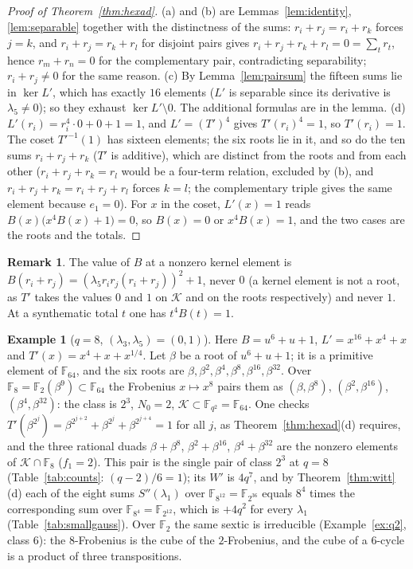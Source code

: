 ﻿\documentclass[12pt,a4paper]{amsart}
\theoremstyle{definition}
\newtheorem{remark}[theorem]{Remark}
\newtheorem{example}[theorem]{Example}
\newcommand{\F}{\mathbb{F}}
\newcommand{\Kk}{\mathcal{K}}
\newcommand{\Spp}{S''}
\begin{document}
\begin{proof}[Proof of Theorem~\ref{thm:hexad}]
(a) and (b) are Lemmas~\ref{lem:identity}, \ref{lem:separable} together with the distinctness of the sums: $r_i+r_j=r_i+r_k$ forces $j=k$, and $r_i+r_j=r_k+r_l$ for disjoint pairs gives $r_i+r_j+r_k+r_l=0=\sum_tr_t$, hence $r_m+r_n=0$ for the complementary pair, contradicting separability; $r_i+r_j\ne0$ for the same reason. (c) By Lemma~\ref{lem:pairsum} the fifteen sums lie in $\ker L'$, which has exactly $16$ elements ($L'$ is separable since its derivative is $\lambda_5\ne0$); so they exhaust $\ker L'\setminus0$. The additional formulas are in the lemma. (d) $L'(r_i)=r_i^4\cdot0+0+1=1$, and $L'=(T')^4$ gives $T'(r_i)^4=1$, so $T'(r_i)=1$. The coset $T'^{-1}(1)$ has sixteen elements; the six roots lie in it, and so do the ten sums $r_i+r_j+r_k$ ($T'$ is additive), which are distinct from the roots and from each other ($r_i+r_j+r_k=r_l$ would be a four-term relation, excluded by (b), and $r_i+r_j+r_k=r_i+r_j+r_l$ forces $k=l$; the complementary triple gives the same element because $e_1=0$). For $x$ in the coset, $L'(x)=1$ reads $B(x)\bigl(x^4B(x)+1\bigr)=0$, so $B(x)=0$ or $x^4B(x)=1$, and the two cases are the roots and the totals.
\end{proof}

\begin{remark}
The value of $B$ at a nonzero kernel element is $B(r_i+r_j)=(\lambda_5r_ir_j(r_i+r_j))^2+1$, never $0$ (a kernel element is not a root, as $T'$ takes the values $0$ and $1$ on $\Kk$ and on the roots respectively) and never $1$. At a synthematic total $t$ one has $t^4B(t)=1$.
\end{remark}

\begin{example}[$q=8$, $(\lambda_3,\lambda_5)=(0,1)$]\label{ex:q8}
Here $B=u^6+u+1$, $L'=x^{16}+x^4+x$ and $T'(x)=x^4+x+x^{1/4}$. Let $\beta$ be a root of $u^6+u+1$; it is a primitive element of $\F_{64}$, and the six roots are $\beta,\beta^2,\beta^4,\beta^8,\beta^{16},\beta^{32}$. Over $\F_8=\F_2(\beta^9)\subset\F_{64}$ the Frobenius $x\mapsto x^8$ pairs them as $(\beta,\beta^8)$, $(\beta^2,\beta^{16})$, $(\beta^4,\beta^{32})$: the class is $2^3$, $N_0=2$, $\Kk\subset\F_{q^2}=\F_{64}$. One checks $T'(\beta^{2^j})=\beta^{2^{j+2}}+\beta^{2^j}+\beta^{2^{j+4}}=1$ for all $j$, as Theorem~\ref{thm:hexad}(d) requires, and the three rational duads $\beta+\beta^8$, $\beta^2+\beta^{16}$, $\beta^4+\beta^{32}$ are the nonzero elements of $\Kk\cap\F_8$ ($f_1=2$). This pair is the single pair of class $2^3$ at $q=8$ (Table~\ref{tab:counts}: $(q-2)/6=1$); its $W'$ is $4q^7$, and by Theorem~\ref{thm:witt}(d) each of the eight sums $\Spp(\lambda_1)$ over $\F_{8^{12}}=\F_{2^{36}}$ equals $8^4$ times the corresponding sum over $\F_{8^4}=\F_{2^{12}}$, which is $+4q^2$ for every $\lambda_1$ (Table~\ref{tab:smallgauss}). Over $\F_2$ the same sextic is irreducible (Example~\ref{ex:q2}, class $6$): the $8$-Frobenius is the cube of the $2$-Frobenius, and the cube of a $6$-cycle is a product of three transpositions.
\end{example}
\end{document}
